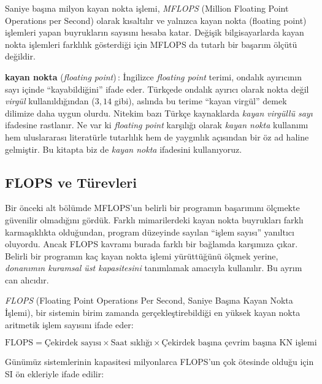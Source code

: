 Saniye başına milyon kayan nokta işlemi, \emph{MFLOPS} (Million Floating Point Operations per Second) olarak kısaltılır ve yalnızca kayan nokta (floating point) işlemleri yapan buyrukların sayısını hesaba katar. Değişik bilgisayarlarda kayan nokta işlemleri farklılık gösterdiği için MFLOPS da tutarlı bir başarım ölçütü değildir.

\begin{terimnotu}
\textbf{kayan nokta} (\emph{floating point})\,: İngilizce \emph{floating point} terimi, ondalık ayırıcının sayı içinde ``kayabildiğini'' ifade eder. Türkçede ondalık ayırıcı olarak nokta değil \emph{virgül} kullanıldığından ($3{,}14$ gibi), aslında bu terime ``kayan virgül'' demek dilimize daha uygun olurdu. Nitekim bazı Türkçe kaynaklarda \emph{kayan virgüllü sayı} ifadesine rastlanır. Ne var ki \emph{floating point} karşılığı olarak \emph{kayan nokta} kullanımı hem uluslararası literatürle tutarlılık hem de yaygınlık açısından bir öz ad haline gelmiştir. Bu kitapta biz de \emph{kayan nokta} ifadesini kullanıyoruz.
\end{terimnotu}

\subsection{FLOPS ve Türevleri}
\label{subsec:flops}

Bir önceki alt bölümde MFLOPS'un belirli bir programın başarımını ölçmekte güvenilir olmadığını gördük. Farklı mimarilerdeki kayan nokta buyrukları farklı karmaşıklıkta olduğundan, program düzeyinde sayılan ``işlem sayısı'' yanıltıcı oluyordu. Ancak FLOPS kavramı burada farklı bir bağlamda karşımıza çıkar. Belirli bir programın kaç kayan nokta işlemi yürüttüğünü ölçmek yerine, \emph{donanımın kuramsal üst kapasitesini} tanımlamak amacıyla kullanılır. Bu ayrım can alıcıdır.

\emph{FLOPS} (Floating Point Operations Per Second, Saniye Başına Kayan Nokta İşlemi), bir sistemin birim zamanda gerçekleştirebildiği en yüksek kayan nokta aritmetik işlem sayısını ifade eder:

\begin{equation}
\text{FLOPS} = \text{Çekirdek sayısı} \times \text{Saat sıklığı} \times \text{Çekirdek başına çevrim başına KN işlemi}
\label{eq:flops}
\end{equation}

Günümüz sistemlerinin kapasitesi milyonlarca FLOPS'un çok ötesinde olduğu için SI ön ekleriyle ifade edilir:

